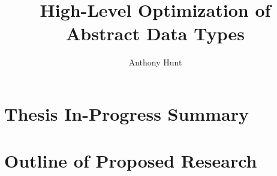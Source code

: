 \documentclass[12pt]{article}
\title{High-Level Optimization of Abstract Data Types}
\author{Anthony Hunt}
\begin{document}
\maketitle

\section{Thesis In-Progress Summary}

\pagebreak
\section{Outline of Proposed Research}


\end{document}
